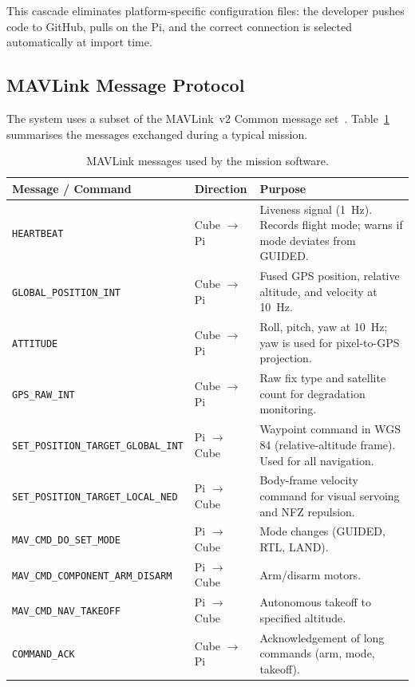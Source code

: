 \noindent This cascade eliminates platform-specific configuration files: the developer pushes code to GitHub, pulls on the Pi, and the correct connection is selected automatically at import time.

\subsection{MAVLink Message Protocol}\label{sec:mavlink-protocol}

The system uses a subset of the MAVLink~v2 Common message set~\cite{mavlink2}. Table~\ref{tab:mavlink-messages} summarises the messages exchanged during a typical mission.

\begin{table}[ht]
  \centering\compactTable
  \caption{MAVLink messages used by the mission software.}\label{tab:mavlink-messages}
  \begin{tabularx}{\linewidth}{@{}l l X@{}}
    \toprule
    \textbf{Message / Command} & \textbf{Direction} & \textbf{Purpose} \\
    \midrule
    \texttt{HEARTBEAT}                        & Cube $\to$ Pi & Liveness signal (\SI{1}{\hertz}). Records flight mode; warns if mode deviates from GUIDED. \\
    \texttt{GLOBAL\_POSITION\_INT}            & Cube $\to$ Pi & Fused GPS position, relative altitude, and velocity at \SI{10}{\hertz}. \\
    \texttt{ATTITUDE}                         & Cube $\to$ Pi & Roll, pitch, yaw at \SI{10}{\hertz}; yaw is used for pixel-to-GPS projection. \\
    \texttt{GPS\_RAW\_INT}                    & Cube $\to$ Pi & Raw fix type and satellite count for degradation monitoring. \\
    \texttt{SET\_POSITION\_TARGET\_GLOBAL\_INT} & Pi $\to$ Cube & Waypoint command in WGS\,84 (relative-altitude frame). Used for all navigation. \\
    \texttt{SET\_POSITION\_TARGET\_LOCAL\_NED}  & Pi $\to$ Cube & Body-frame velocity command for visual servoing and NFZ repulsion. \\
    \texttt{MAV\_CMD\_DO\_SET\_MODE}          & Pi $\to$ Cube & Mode changes (GUIDED, RTL, LAND). \\
    \texttt{MAV\_CMD\_COMPONENT\_ARM\_DISARM} & Pi $\to$ Cube & Arm/disarm motors. \\
    \texttt{MAV\_CMD\_NAV\_TAKEOFF}           & Pi $\to$ Cube & Autonomous takeoff to specified altitude. \\
    \texttt{COMMAND\_ACK}                     & Cube $\to$ Pi & Acknowledgement of long commands (arm, mode, takeoff). \\
    \bottomrule
  \end{tabularx}
\end{table}

